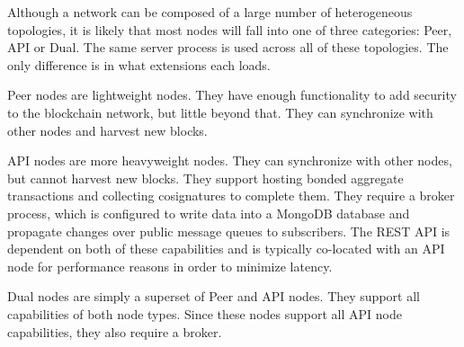 Although a network can be composed of a large number of heterogeneous topologies, it is likely that most nodes will fall into one of three categories: Peer, API or Dual.
The same server process is used across all of these topologies.
The only difference is in what extensions each loads.

Peer nodes are lightweight nodes.
They have enough functionality to add security to the blockchain network, but little beyond that.
They can synchronize with other nodes and harvest new blocks.

API nodes are more heavyweight nodes.
They can synchronize with other nodes, but cannot harvest new blocks.
They support hosting bonded aggregate transactions and collecting cosignatures to complete them.
They require a broker process, which is configured to write data into a MongoDB database and propagate changes over public message queues to subscribers.
The REST API is dependent on both of these capabilities and is typically co-located with an API node for performance reasons in order to minimize latency.

Dual nodes are simply a superset of Peer and API nodes.
They support all capabilities of both node types.
Since these nodes support all API node capabilities, they also require a broker.
